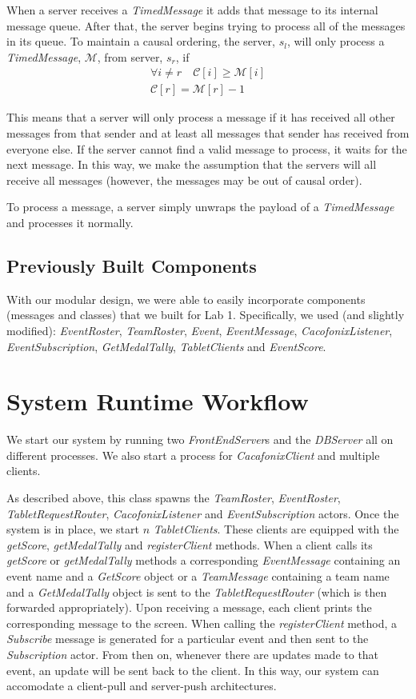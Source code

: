 \documentclass[11pt]{article}
\begin{document}
When a server receives a \emph{TimedMessage} it adds that message to
its internal message queue. After that, the server begins trying to
process all of the messages in its queue.  To maintain a causal
ordering, the server, $s_l$, will only process a \emph{TimedMessage},
$\mathcal{M}$, from server, $s_r$, if
\begin{align*}
 \forall i \ne r \quad \mathcal{C}[i] \ge \mathcal{M}[i] \\
 \mathcal{C}[r] = \mathcal{M}[r] - 1
\end{align*}

This means that a server will only process a message if it has
received all other messages from that sender and at least all messages
that sender has received from everyone else.  If the server cannot
find a valid message to process, it waits for the next message. In
this way, we make the assumption that the servers will all receive all
messages (however, the messages may be out of causal order).

To process a message, a server simply unwraps the payload of a
\emph{TimedMessage} and processes it normally.

\subsection{Previously Built Components}
With our modular design, we were able to easily incorporate components
(messages and classes) that we built for Lab 1.  Specifically, we used
(and slightly modified): \emph{EventRoster}, \emph{TeamRoster},
\emph{Event}, \emph{EventMessage}, \emph{CacofonixListener},
\emph{EventSubscription}, \emph{GetMedalTally}, \emph{TabletClients}
and \emph{EventScore}.

\section{System Runtime Workflow}
We start our system by running two
\emph{FrontEndServer}s and the \emph{DBServer} all on different processes.
We also start a process for \emph{CacafonixClient} and multiple
clients.

 As
described above, this class spawns the \emph{TeamRoster},
\emph{EventRoster}, \emph{TabletRequestRouter},
\emph{CacofonixListener} and \emph{EventSubscription} actors.  Once
the system is in place, we start $n$ \emph{TabletClients}.  These
clients are equipped with the \emph{getScore}, \emph{getMedalTally}
and \emph{registerClient} methods. When a client calls its
\emph{getScore} or \emph{getMedalTally} methods a corresponding
\emph{EventMessage} containing an event name and a \emph{GetScore}
object or a \emph{TeamMessage} containing a team name and a
\emph{GetMedalTally} object is sent to the \emph{TabletRequestRouter}
(which is then forwarded appropriately).  Upon receiving a message, each
client prints the corresponding message to the screen.  When calling
the \emph{registerClient} method, a \emph{Subscribe} message is
generated for a particular event and then sent to the
\emph{Subscription} actor.  From then on, whenever there are updates
made to that event, an update will be sent back to the client.  In
this way, our system can accomodate a client-pull and server-push
architectures.
\end{document}
